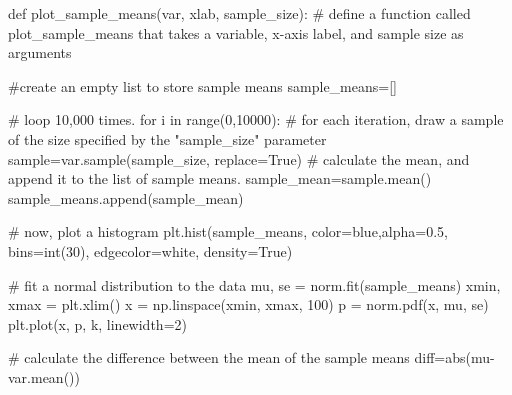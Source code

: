 \documentclass[
  letterpaper,
  DIV=11,
  numbers=noendperiod]{scrreprt}
\newenvironment{Shaded}{\begin{snugshade}}{\end{snugshade}}
\newcommand{\BuiltInTok}[1]{\textcolor[rgb]{0.00,0.23,0.31}{#1}}
\newcommand{\CommentTok}[1]{\textcolor[rgb]{0.37,0.37,0.37}{#1}}
\newcommand{\ControlFlowTok}[1]{\textcolor[rgb]{0.00,0.23,0.31}{#1}}
\newcommand{\DecValTok}[1]{\textcolor[rgb]{0.68,0.00,0.00}{#1}}
\newcommand{\FloatTok}[1]{\textcolor[rgb]{0.68,0.00,0.00}{#1}}
\newcommand{\KeywordTok}[1]{\textcolor[rgb]{0.00,0.23,0.31}{#1}}
\newcommand{\NormalTok}[1]{\textcolor[rgb]{0.00,0.23,0.31}{#1}}
\newcommand{\OperatorTok}[1]{\textcolor[rgb]{0.37,0.37,0.37}{#1}}
\newcommand{\StringTok}[1]{\textcolor[rgb]{0.13,0.47,0.30}{#1}}
\newcommand{\VariableTok}[1]{\textcolor[rgb]{0.07,0.07,0.07}{#1}}
\begin{document}
\begin{Shaded}
\begin{Highlighting}[]
\KeywordTok{def}\NormalTok{ plot\_sample\_means(var, xlab, sample\_size): }\CommentTok{\# define a function called plot\_sample\_means that takes a variable, x{-}axis label, and sample size as arguments}

    \CommentTok{\#create an empty list to store sample means}
\NormalTok{    sample\_means}\OperatorTok{=}\NormalTok{[]}

    \CommentTok{\# loop 10,000 times.}
    \ControlFlowTok{for}\NormalTok{ i }\KeywordTok{in} \BuiltInTok{range}\NormalTok{(}\DecValTok{0}\NormalTok{,}\DecValTok{10000}\NormalTok{):}
        \CommentTok{\# for each iteration, draw a sample of the size specified by the "sample\_size" parameter}
\NormalTok{        sample}\OperatorTok{=}\NormalTok{var.sample(sample\_size, replace}\OperatorTok{=}\VariableTok{True}\NormalTok{)}
        \CommentTok{\# calculate the mean, and append it to the list of sample means. }
\NormalTok{        sample\_mean}\OperatorTok{=}\NormalTok{sample.mean()}
\NormalTok{        sample\_means.append(sample\_mean)}
    
    \CommentTok{\# now, plot a histogram }
\NormalTok{    plt.hist(sample\_means, color}\OperatorTok{=}\StringTok{\textquotesingle{}blue\textquotesingle{}}\NormalTok{,alpha}\OperatorTok{=}\FloatTok{0.5}\NormalTok{, bins}\OperatorTok{=}\BuiltInTok{int}\NormalTok{(}\DecValTok{30}\NormalTok{), edgecolor}\OperatorTok{=}\StringTok{\textquotesingle{}white\textquotesingle{}}\NormalTok{, density}\OperatorTok{=}\VariableTok{True}\NormalTok{)}
    
    \CommentTok{\# fit a normal distribution to the data }
\NormalTok{    mu, se }\OperatorTok{=}\NormalTok{ norm.fit(sample\_means)}
\NormalTok{    xmin, xmax }\OperatorTok{=}\NormalTok{ plt.xlim()}
\NormalTok{    x }\OperatorTok{=}\NormalTok{ np.linspace(xmin, xmax, }\DecValTok{100}\NormalTok{)}
\NormalTok{    p }\OperatorTok{=}\NormalTok{ norm.pdf(x, mu, se) }
\NormalTok{    plt.plot(x, p, }\StringTok{\textquotesingle{}k\textquotesingle{}}\NormalTok{, linewidth}\OperatorTok{=}\DecValTok{2}\NormalTok{)}

    \CommentTok{\# calculate the difference between the mean of the sample means }
\NormalTok{    diff}\OperatorTok{=}\BuiltInTok{abs}\NormalTok{(mu}\OperatorTok{{-}}\NormalTok{var.mean())}
    

\end{Highlighting}
\end{Shaded}
\end{document}
